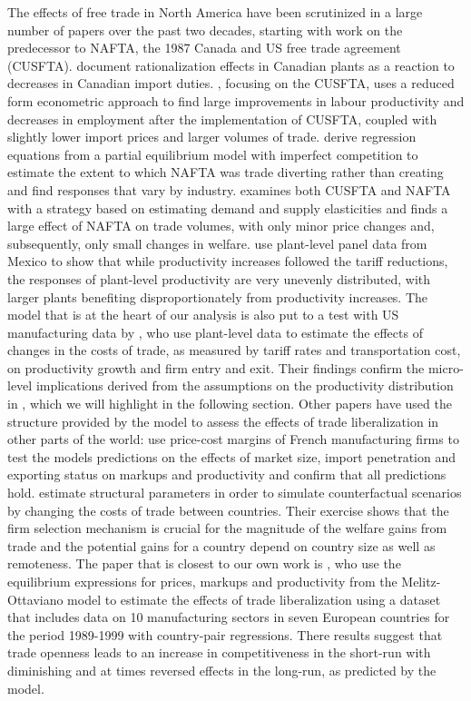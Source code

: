 The effects of free trade in North America have been scrutinized in a large number of papers over the past two decades, starting with work on the predecessor to NAFTA, the 1987 Canada and US free trade agreement (CUSFTA). \citet{Head1999} document rationalization effects in Canadian plants as a reaction to decreases in Canadian import duties. \citet{Trefler2004}, focusing on the CUSFTA, uses a reduced form econometric approach to find large improvements in labour productivity and decreases in employment after the implementation of CUSFTA, coupled with slightly lower import prices and larger volumes of trade. \citet*{Fukao2003} derive regression equations from a partial equilibrium model with imperfect competition to estimate the extent to which NAFTA was trade diverting rather than creating and find responses that vary by industry. \citet{Romalis2007} examines both CUSFTA and NAFTA with a strategy based on estimating demand and supply elasticities and finds a large effect of NAFTA on trade volumes, with only minor price changes and, subsequently, only small changes in welfare. \citet{Calderon-Madrid2007} use plant-level panel data from Mexico to show that while productivity increases followed the tariff reductions, the responses of plant-level productivity are very unevenly distributed, with larger plants benefiting disproportionately from productivity increases. The \citet{Melitz2003} model that is at the heart of our analysis is also put to a test with US manufacturing data by \citet*{Bernard2006a}, who use plant-level data to estimate the effects of changes in the costs of trade, as measured by tariff rates and transportation cost, on productivity growth and firm entry and exit. Their findings confirm the micro-level implications derived from the assumptions on the productivity distribution in \citet{Melitz2003}, which we will highlight in the following section. Other papers have used the structure provided by the \citet{MelitzOttaviano2008} model to assess the effects of trade liberalization in other parts of the world: \citet{Bellone2008} use price-cost margins of French manufacturing firms to test the models predictions on the effects of market size, import penetration and exporting status on markups and productivity and confirm that all predictions hold. \citet{Corcos2011} estimate structural parameters in order to simulate counterfactual scenarios by changing the costs of trade between countries. Their exercise shows that the firm selection mechanism is crucial for the magnitude of the welfare gains from trade and the potential gains for a country depend on country size as well as remoteness. The paper that is closest to our own work is \citet{Chen2009}, who use the equilibrium expressions for prices, markups and productivity from the Melitz-Ottaviano model to estimate the effects of trade liberalization using a dataset that includes data on 10 manufacturing sectors in seven European countries for the period 1989-1999 with country-pair regressions. There results suggest that trade openness leads to an increase in competitiveness in the short-run with diminishing and at times reversed effects in the long-run, as predicted by the model. 

